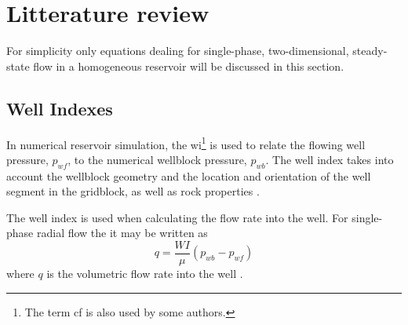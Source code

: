 
\section{Litterature review} %
\label{sec:litterature_review}
For simplicity only equations dealing for single-phase, two-dimensional, steady-state flow in a homogeneous reservoir will be discussed in this section.

\subsection{Well Indexes} %
\label{sub:well_indices}
In numerical reservoir simulation, the \gls{wi}\footnote{The term \gls{cf} is also used by some authors\cite{Peaceman2003New,Schlumberger2013Eclipse}.} is used to relate the flowing well pressure, $p_{wf}$,  to the numerical wellblock pressure, $p_{wb}$. The well index takes into account the wellblock geometry and the location and orientation of the well segment in the gridblock, as well as rock properties \cite{Peaceman2003New}.

The well index is used when calculating the flow rate into the well. For single-phase radial flow the it may be written as
\begin{equation}
    \label{eq:peaceman-wi1}
    q = \frac{WI}{\mu} \left( p_{wb} - p_{wf} \right)
\end{equation}
where $q$ is the volumetric flow rate into the well \cite{Peaceman2003New}.

